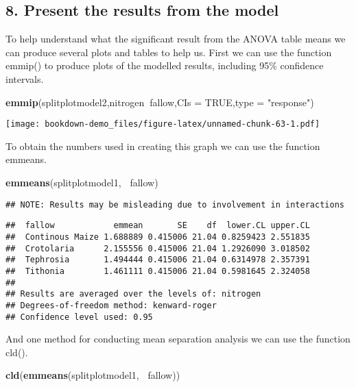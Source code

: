 \documentclass[]{book}
\newenvironment{Shaded}{\begin{snugshade}}{\end{snugshade}}
\newcommand{\KeywordTok}[1]{\textcolor[rgb]{0.13,0.29,0.53}{\textbf{#1}}}
\newcommand{\DataTypeTok}[1]{\textcolor[rgb]{0.13,0.29,0.53}{#1}}
\newcommand{\StringTok}[1]{\textcolor[rgb]{0.31,0.60,0.02}{#1}}
\newcommand{\OtherTok}[1]{\textcolor[rgb]{0.56,0.35,0.01}{#1}}
\newcommand{\OperatorTok}[1]{\textcolor[rgb]{0.81,0.36,0.00}{\textbf{#1}}}
\newcommand{\NormalTok}[1]{#1}
\theoremstyle{definition}
\theoremstyle{definition}
\theoremstyle{definition}
\theoremstyle{remark}
\begin{document}
\subsection{8. Present the results from the
model}\label{present-the-results-from-the-model-1}

To help understand what the significant result from the ANOVA table
means we can produce several plots and tables to help us. First we can
use the function emmip() to produce plots of the modelled results,
including 95\% confidence intervals.

\begin{Shaded}
\begin{Highlighting}[]
\KeywordTok{emmip}\NormalTok{(splitplotmodel2,nitrogen}\OperatorTok{~}\NormalTok{fallow,}\DataTypeTok{CIs =} \OtherTok{TRUE}\NormalTok{,}\DataTypeTok{type =} \StringTok{"response"}\NormalTok{)}
\end{Highlighting}
\end{Shaded}

\texttt{[image: bookdown-demo\_files/figure-latex/unnamed-chunk-63-1.pdf]}

To obtain the numbers used in creating this graph we can use the
function emmeans.

\begin{Shaded}
\begin{Highlighting}[]
\KeywordTok{emmeans}\NormalTok{(splitplotmodel1, }\OperatorTok{~}\NormalTok{fallow)}
\end{Highlighting}
\end{Shaded}

\begin{verbatim}
## NOTE: Results may be misleading due to involvement in interactions
\end{verbatim}

\begin{verbatim}
##  fallow            emmean       SE    df  lower.CL upper.CL
##  Continous Maize 1.688889 0.415006 21.04 0.8259423 2.551835
##  Crotolaria      2.155556 0.415006 21.04 1.2926090 3.018502
##  Tephrosia       1.494444 0.415006 21.04 0.6314978 2.357391
##  Tithonia        1.461111 0.415006 21.04 0.5981645 2.324058
## 
## Results are averaged over the levels of: nitrogen 
## Degrees-of-freedom method: kenward-roger 
## Confidence level used: 0.95
\end{verbatim}

And one method for conducting mean separation analysis we can use the
function cld().

\begin{Shaded}
\begin{Highlighting}[]
\KeywordTok{cld}\NormalTok{(}\KeywordTok{emmeans}\NormalTok{(splitplotmodel1, }\OperatorTok{~}\NormalTok{fallow))}
\end{Highlighting}
\end{Shaded}
\end{document}

